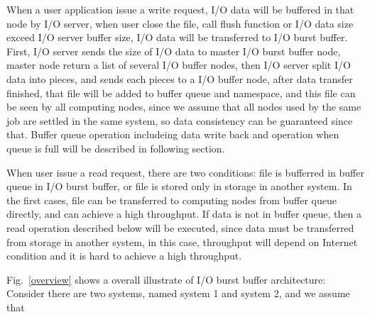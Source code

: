 \documentclass[JIP,draft]{ipsj}
\begin{document}
When a user application issue a write request, I/O data will be buffered in that node by I/O server, when user close the file, call flush function or I/O data size exceed I/O server buffer size, I/O data will be transferred to I/O burst buffer.
First, I/O server sends the size of I/O data to master I/O burst buffer node, master node return a list of several I/O buffer nodes, then I/O server split I/O data into pieces, and sends each pieces to a I/O buffer node, after data transfer finished, that file will be added to buffer queue and namespace, and this file can be seen by all computing nodes, since we assume that all nodes used by the same job are settled in the same system, so data consistency can be guaranteed since that.
Buffer queue operation includeing data write back and operation when queue is full will be described in following section.

When user issue a read request, there are two conditions: file is bufferred in buffer queue in I/O burst buffer, or file is stored only in storage in another system.
In the first cases, file can be transferred to computing nodes from buffer queue directly, and can achieve a high throughput.
If data is not in buffer queue, then a read operation described below will be executed, since data must be transferred from storage in another system, in this case, throughput will depend on Internet condition and it is hard to achieve a high throughput.


Fig.~\ref{overview} shows a overall illustrate of I/O burst buffer architecture:
Consider there are two systems, named system 1 and system 2, and we assume that 

\end{document}
